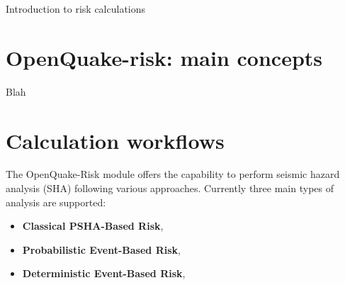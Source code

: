 Introduction to risk calculations
%
\section{OpenQuake-risk: main concepts}
Blah
%
\section{Calculation workflows}
The OpenQuake-Risk module offers the capability to perform seismic hazard 
analysis (SHA) following various approaches. Currently three main types of 
analysis are supported:
\begin{itemize}
\item \textbf{Classical PSHA-Based Risk}, 
\item \textbf{Probabilistic Event-Based Risk}, 
\item \textbf{Deterministic Event-Based Risk}, 
\end{itemize}

%